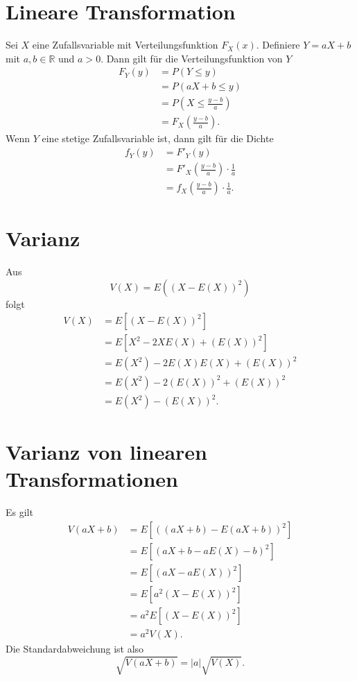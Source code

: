 \documentclass{article}
\begin{document}
\section*{Lineare Transformation}

Sei $X$ eine Zufallsvariable mit Verteilungsfunktion $F_X(x)$.
Definiere $Y=aX+b$ mit $a,b\in\mathbb{R}$ und $a>0$. 
Dann gilt für die Verteilungsfunktion von $Y$
\begin{align*}
F_Y(y) &= P(Y\le y) \\
&= P(aX+b\le y)\\
&= P\left(X\le \frac{y-b}{a}\right)\\
&= F_X\left(\frac{y-b}{a}\right).
\end{align*}
Wenn $Y$ eine stetige Zufallsvariable ist, dann gilt für
die Dichte
\begin{align*}
f_Y(y) &= F'_Y(y) \\
&= F'_X\left(\frac{y-b}{a}\right)\cdot\frac{1}{a}\\
&= f_X\left(\frac{y-b}{a}\right)\cdot\frac{1}{a}.
\end{align*}

\section*{Varianz}
Aus
\[ V(X)=E((X-E(X))^2) \]
folgt
\begin{align*}
V(X) &= E[(X-E(X))^2] \\
&= E[X^2-2XE(X)+(E(X))^2] \\
&= E(X^2)-2E(X)E(X)+(E(X))^2 \\
&= E(X^2)-2(E(X))^2+(E(X))^2\\
&= E(X^2)-(E(X))^2.
\end{align*}

\section*{Varianz von linearen Transformationen}
Es gilt
\begin{align*}
V(aX+b) &= E[((aX+b)-E(aX+b))^2]\\
&= E[(aX+b-aE(X)-b)^2] \\
&= E[(aX-aE(X))^2]\\
&= E[a^2(X-E(X))^2]\\
&= a^2 E[(X-E(X))^2]\\
&= a^2 V(X).
\end{align*}
Die Standardabweichung ist also
\[ \sqrt{V(aX+b)} = |a|\sqrt{V(X)}. \]
\end{document}
